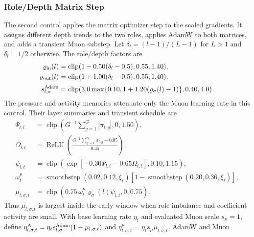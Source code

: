 \documentclass{article}
\newcommand{\clip}{\operatorname{clip}}
\newcommand{\relu}{\operatorname{ReLU}}
\newcommand{\smooth}{\operatorname{smoothstep}}
\begin{document}
\subsubsection{Role/Depth Matrix Step}

The second control applies the matrix optimizer step to the scaled gradients.
It assigns different depth trends to the two roles, applies AdamW to both
matrices, and adds a transient Muon substep.  Let
$\delta_l=(l-1)/(L-1)$ for $L>1$ and $\delta_l=1/2$ otherwise.  The role/depth
factors are
\begin{equation}
\begin{aligned}
    \varrho_{\mathrm{in}}(l)
    &=
    \clip(1-0.50(\delta_l-0.5),0.55,1.40),
    \\
    \varrho_{\mathrm{out}}(l)
    &=
    \clip(1+1.00(\delta_l-0.5),0.55,1.40),
    \\[2pt]
    s^{\rm Adam}_{l,\sigma}
    &=
    \clip\!\left(
    3.0\max\{0.10,1+1.20(\varrho_\sigma(l)-1)\},
    0.40,4.0
    \right).
\end{aligned}
\label{eq:role-depth-scales}
\end{equation}
The pressure and activity memories attenuate only the Muon learning rate in this
control.  Their layer summaries and transient schedule are
\begin{equation}
\begin{aligned}
    \Psi_{l,t}
    &=
    \clip\!\left(G^{-1}\sum_{g=1}^{G}|\pi_{l,g}|,0,1.50\right),
    \\
    \Omega_{l,t}
    &=
    \relu\!\left(\frac{G^{-1}\sum_{g=1}^{G}\alpha_{l,g}-0.05}{0.45}\right),
    \\[2pt]
    \psi_{l,t}
    &=
    \clip\!\left(\exp[-0.30\Psi_{l,t}-0.65\Omega_{l,t}],0.10,1.15\right),
    \\[2pt]
    \omega^{\mu}_t
    &=
    \smooth(0.02,0.12,\xi_t)
    [1-\smooth(0.20,0.36,\xi_t)],
    \\[2pt]
    \mu_{l,\sigma,t}
    &=
    \clip\!\left(
    0.75\,\omega^{\mu}_t\varrho_\sigma(l)\psi_{l,t},
    0,0.75
    \right).
\end{aligned}
\label{eq:matrix-branch-schedule}
\end{equation}
Thus $\mu_{l,\sigma,t}$ is largest inside the early window when role imbalance
and coefficient activity are small.  With base learning rate $\eta_t$ and
evaluated Muon scale $s_\mu=1$, define
$\eta^{\rm A}_{l,\sigma,t}=\eta_t s^{\rm Adam}_{l,\sigma}(1-\mu_{l,\sigma,t})$
and $\eta^{\mu}_{l,\sigma,t}=\eta_t s_\mu\mu_{l,\sigma,t}$.  AdamW and Muon
\end{document}
